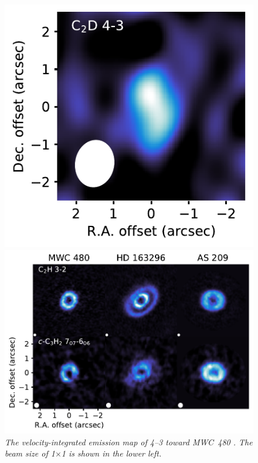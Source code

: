\documentclass[12pt,a4paper]{article}  %
\begin{document}
\begin{figure}[tbph]
\centering
\begin{minipage}[b]{0.35\hsize}
\centering
\includegraphics[scale=0.88]{MWC_480_C2D_mom0}
\caption{\em{The velocity-integrated emission map of  4--3 toward MWC~480 \citep{Loomis20}. The beam size of 1$\times$1 is shown in the lower left.}}
\label{fig:C2D_mom0}
\end{minipage}
\hspace{1em}
\begin{minipage}[b]{0.6\hsize}
\centering
\includegraphics[scale=0.7]{MAPS_hydrocarbon_garelly}

\end{minipage}
\end{figure}
\end{document}
